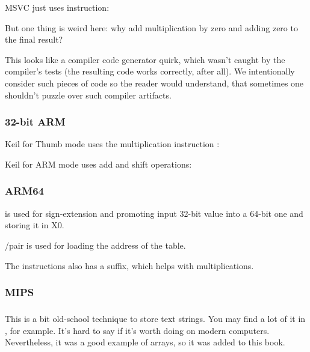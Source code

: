\NonOptimizing MSVC just uses \IMUL instruction:



\myindex{\CompilerAnomaly}
\label{MSVC2013_anomaly}

But one thing is weird here: why add multiplication by zero and adding zero to the final result?

This looks like a compiler code generator quirk, which wasn't caught by the compiler's tests
(the resulting code works correctly, after all).
%
We intentionally consider such pieces of code so the reader would understand, 
that sometimes one shouldn't puzzle over such compiler artifacts.

\subsubsection{32-bit ARM}

\Optimizing Keil 
for Thumb mode uses the multiplication instruction :



\Optimizing Keil for ARM mode uses add and shift operations:



\subsubsection{ARM64}




 is used for sign-extension and promoting input 32-bit value into a 64-bit one and storing it in X0.

\ADRP/\ADD pair is used for loading the address of the table.

The \ADD instructions also has a \LSL suffix, which helps with multiplications.

\subsubsection{MIPS}


\subsubsection{\Conclusion{}}

This is a bit old-school technique to store text strings.
You may find a lot of it in \oracle, for example.
It's hard to say if it's worth doing on modern computers.
Nevertheless, it was a good example of arrays, so it was added to this book.


